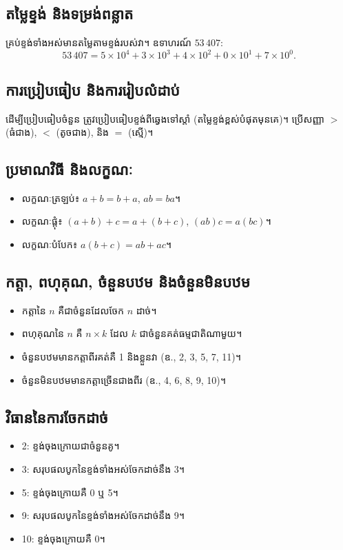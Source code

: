 \subsection{តម្លៃខ្ទង់ និងទម្រង់ពន្លាត}
គ្រប់ខ្ទង់ទាំងអស់មានតម្លៃតាមខ្ទង់របស់វា។ ឧទាហរណ៍ $53\,407$:
    \[
        53\,407 = 5\times10^4 + 3\times10^3 + 4\times10^2 + 0\times10^1 + 7\times10^0.
    \]

\subsection{ការប្រៀបធៀប និងការរៀបលំដាប់}
ដើម្បីប្រៀបធៀបចំនួន ត្រូវប្រៀបធៀបខ្ទង់ពីឆ្វេងទៅស្តាំ (តម្លៃខ្ទង់ខ្ពស់បំផុតមុនគេ)។ ប្រើសញ្ញា $>$ (ធំជាង), $<$ (តូចជាង), និង $=$ (ស្មើ)។

\subsection{ប្រមាណវិធី និងលក្ខណៈ}
    \begin{itemize}[label=---,nosep]
        \item លក្ខណៈត្រឡប់៖ $a+b=b+a$, $ab=ba$។
        \item លក្ខណៈផ្ដុំ៖ $(a+b)+c=a+(b+c)$, $(ab)c=a(bc)$។
        \item លក្ខណៈបំបែក៖ $a(b+c)=ab+ac$។
    \end{itemize}

\subsection{កត្តា, ពហុគុណ, ចំនួនបឋម និងចំនួនមិនបឋម}
    \begin{itemize}[label=---,nosep]
        \item កត្តានៃ $n$ គឺជាចំនួនដែលចែក $n$ ដាច់។
        \item ពហុគុណនៃ $n$ គឺ $n\times k$ ដែល $k$ ជាចំនួនគត់ធម្មជាតិណាមួយ។
        \item ចំនួនបឋមមានកត្តាពីរគត់គឺ 1 និងខ្លួនវា (ឧ., 2, 3, 5, 7, 11)។
        \item ចំនួនមិនបឋមមានកត្តាច្រើនជាងពីរ (ឧ., 4, 6, 8, 9, 10)។
    \end{itemize}

\subsection{វិធាននៃការចែកដាច់}
    \begin{itemize}[label=-]
        \item 2: ខ្ទង់ចុងក្រោយជាចំនួនគូ។
        \item 3: សរុបផលបូកនៃខ្ទង់ទាំងអស់ចែកដាច់នឹង 3។
        \item 5: ខ្ទង់ចុងក្រោយគឺ 0 ឬ 5។
        \item 9: សរុបផលបូកនៃខ្ទង់ទាំងអស់ចែកដាច់នឹង 9។
        \item 10: ខ្ទង់ចុងក្រោយគឺ 0។
    \end{itemize}

